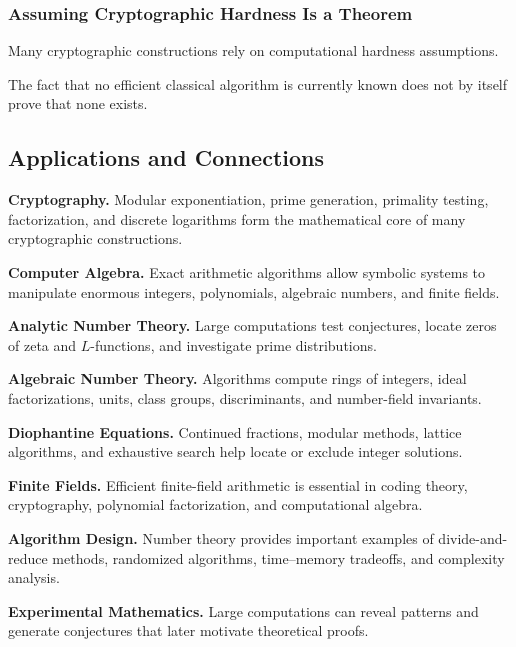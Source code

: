 \subsubsection{Assuming Cryptographic Hardness Is a Theorem}

Many cryptographic constructions rely on computational hardness assumptions.

The fact that no efficient classical algorithm is currently known does not
by itself prove that none exists.

\subsection{Applications and Connections}
\label{subsec:computational-number-theory-applications}

\begin{applicationbox}
\textbf{Cryptography.}
Modular exponentiation, prime generation, primality testing, factorization,
and discrete logarithms form the mathematical core of many cryptographic
constructions.

\medskip

\textbf{Computer Algebra.}
Exact arithmetic algorithms allow symbolic systems to manipulate enormous
integers, polynomials, algebraic numbers, and finite fields.

\medskip

\textbf{Analytic Number Theory.}
Large computations test conjectures, locate zeros of zeta and \(L\)-functions,
and investigate prime distributions.

\medskip

\textbf{Algebraic Number Theory.}
Algorithms compute rings of integers, ideal factorizations, units, class
groups, discriminants, and number-field invariants.

\medskip

\textbf{Diophantine Equations.}
Continued fractions, modular methods, lattice algorithms, and exhaustive
search help locate or exclude integer solutions.

\medskip

\textbf{Finite Fields.}
Efficient finite-field arithmetic is essential in coding theory,
cryptography, polynomial factorization, and computational algebra.

\medskip

\textbf{Algorithm Design.}
Number theory provides important examples of divide-and-reduce methods,
randomized algorithms, time--memory tradeoffs, and complexity analysis.

\medskip

\textbf{Experimental Mathematics.}
Large computations can reveal patterns and generate conjectures that later
motivate theoretical proofs.
\end{applicationbox}

